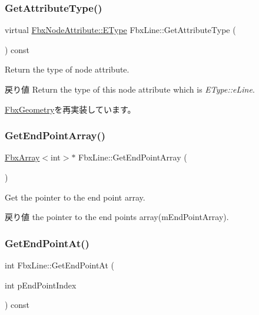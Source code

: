 \subsubsection{\texorpdfstring{Get\+Attribute\+Type()}{GetAttributeType()}}
{\footnotesize\ttfamily virtual \hyperlink{class_fbx_node_attribute_a08e1669d3d1a696910756ab17de56d6a}{Fbx\+Node\+Attribute\+::\+E\+Type} Fbx\+Line\+::\+Get\+Attribute\+Type (\begin{DoxyParamCaption}{ }\end{DoxyParamCaption}) const\hspace{0.3cm}{\ttfamily [virtual]}}

Return the type of node attribute. \begin{DoxyReturn}{戻り値}
Return the type of this node attribute which is {\itshape E\+Type\+::e\+Line}. 
\end{DoxyReturn}


\hyperlink{class_fbx_geometry_a41ae23e5d0cf08693bca49737f333de9}{Fbx\+Geometry}を再実装しています。

\mbox{\label{class_fbx_line_aeeb413ccc5affa0f04d1b5275d355c9b}} 
\subsubsection{\texorpdfstring{Get\+End\+Point\+Array()}{GetEndPointArray()}}
{\footnotesize\ttfamily \hyperlink{class_fbx_array}{Fbx\+Array}$<$int$>$$\ast$ Fbx\+Line\+::\+Get\+End\+Point\+Array (\begin{DoxyParamCaption}{ }\end{DoxyParamCaption})}

Get the pointer to the end point array. \begin{DoxyReturn}{戻り値}
the pointer to the end points array(m\+End\+Point\+Array). 
\end{DoxyReturn}
\mbox{\label{class_fbx_line_a5a0bcc66d6ba13f98fd9e546bf5f704a}} 
\subsubsection{\texorpdfstring{Get\+End\+Point\+At()}{GetEndPointAt()}}
{\footnotesize\ttfamily int Fbx\+Line\+::\+Get\+End\+Point\+At (\begin{DoxyParamCaption}\item[{int}]{p\+End\+Point\+Index }\end{DoxyParamCaption}) const}

